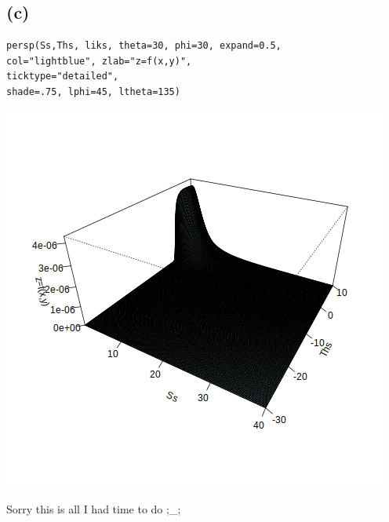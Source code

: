 \documentclass[11pt]{article}
\begin{document}
\subsection*{(c)}
\label{sec:org7026247}

\begin{verbatim}
persp(Ss,Ths, liks, theta=30, phi=30, expand=0.5, 
col="lightblue", zlab="z=f(x,y)",  
ticktype="detailed", 
shade=.75, lphi=45, ltheta=135)
\end{verbatim}

\begin{center}
\includegraphics[width=.9\linewidth]{3d.png}
\end{center}


Sorry this is all I had time to do ;\_; 
\end{document}
